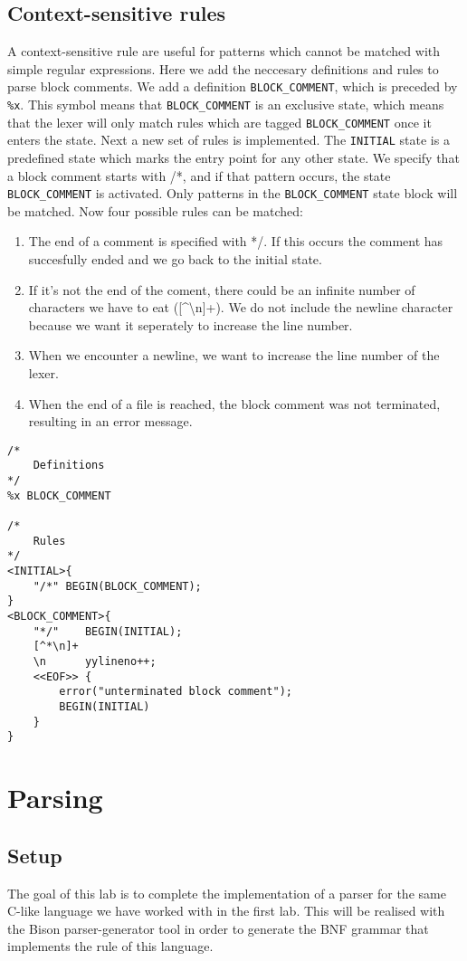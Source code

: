 \documentclass{report}
\begin{document}
	\section{Context-sensitive rules}
	A context-sensitive rule are useful for patterns which cannot be matched with simple regular expressions. Here we add the neccesary definitions and rules to parse block comments. We add a definition \texttt{BLOCK\_COMMENT}, which is preceded by \texttt{\%x}. This symbol means that \texttt{BLOCK\_COMMENT} is an exclusive state, which means that the lexer will only match rules which are tagged \texttt{BLOCK\_COMMENT} once it enters the state. Next a new set of rules is implemented. The \texttt{INITIAL} state is a predefined state which marks the entry point for any other state. We specify that a block comment starts with /*, and if that pattern occurs, the state \texttt{BLOCK\_COMMENT} is activated. Only patterns in the \texttt{BLOCK\_COMMENT} state block will be matched. Now four possible rules can be matched:
	\begin{enumerate}
		\item The end of a comment is specified with */. If this occurs the comment has succesfully ended and we go back to the initial state.
		\item If it's not the end of the coment, there could be an infinite number of characters we have to eat ([\textasciicircum *\textbackslash n]+). We do not include the newline character because we want it seperately to increase the line number.
		\item When we encounter a newline, we want to increase the line number of the lexer.
		\item When the end of a file is reached, the block comment was not terminated, resulting in an error message.
	\end{enumerate}
	\begin{lstlisting}
/*
	Definitions
*/
%x BLOCK_COMMENT

/*
	Rules
*/
<INITIAL>{
	"/*" BEGIN(BLOCK_COMMENT);
}
<BLOCK_COMMENT>{
	"*/"	BEGIN(INITIAL);
	[^*\n]+
	\n		yylineno++;
	<<EOF>> {
		error("unterminated block comment");
		BEGIN(INITIAL)
	}
}
	\end{lstlisting}
	\chapter{Parsing}
	\section{Setup}
	The goal of this lab is to complete the implementation of a parser for the same C-like language we have worked with in the first lab. This will be realised with the Bison parser-generator tool in order to generate the BNF grammar that implements the rule of this language.
	
\end{document}
